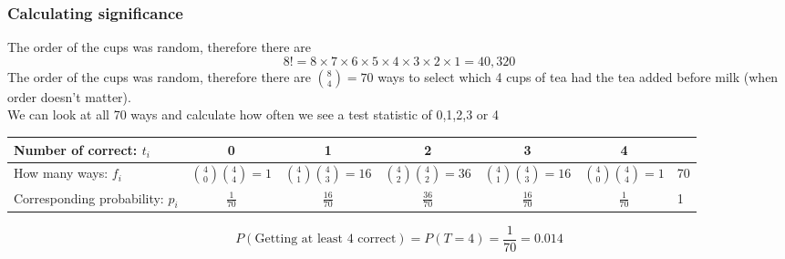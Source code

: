 \documentclass[a4paper]{article}\usepackage[]{graphicx}\usepackage[]{xcolor}
\begin{document}
\subsubsection{Calculating significance}
The order of the cups was random, therefore there are
\[
	8! = 8 \times 7 \times 6 \times 5 \times 4 \times 3 \times 2 \times 1 = 40,320
\]
The order of the cups was random, therefore there are \( \binom{8}{4} = 70 \) ways to select which 4 cups of tea had the tea added before milk (when order doesn't matter).\\
We can look at all 70 ways and calculate how often we see a test statistic of 0,1,2,3 or 4
\begin{table}[H]
	\centering
	\begin{tabular}{@{}lccccc|l@{}}
	\toprule
	Number of correct: \( t_i \) & 0 & 1 & 2 & 3 & 4 &  \\ \midrule
	How many ways: \( f_i \) & \( \binom{4}{0} \binom{4}{4} = 1 \) & \( \binom{4}{1} \binom{4}{3} = 16 \) & \( \binom{4}{2} \binom{4}{2} = 36 \) & \( \binom{4}{1} \binom{4}{3} = 16 \) & \( \binom{4}{0} \binom{4}{4} = 1 \) & 70 \\
	Corresponding probability: \( p_i \) & \( \frac{1}{70} \) & \( \frac{16}{70} \) & \( \frac{36}{70} \) & \( \frac{16}{70} \) & \( \frac{1}{70} \) & 1 \\ \bottomrule
	\end{tabular}
\end{table}
\[
	P(\text{Getting at least 4 correct}) = P(T=4) = \frac{1}{70} = 0.014
\]
\end{document}
